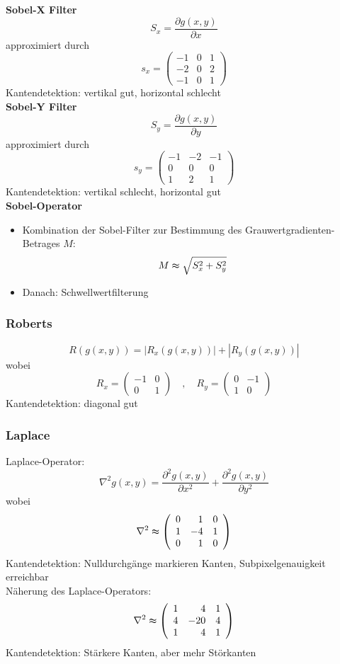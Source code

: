 \textbf{Sobel-X Filter} $$S_x = \frac{\partial g(x,y)}{\partial x}$$ approximiert durch $$s_x = \left( \begin{array}{ccc} -1 & 0 & 1 \\ -2 & 0 & 2 \\ -1 & 0 & 1 \end{array} \right)$$
Kantendetektion: vertikal gut, horizontal schlecht \\
\textbf{Sobel-Y Filter} $$S_y = \frac{\partial g(x,y)}{\partial y}$$ approximiert durch $$s_y = \left( \begin{array}{rrr} -1 & -2 & -1 \\ 0 & 0 & 0 \\ 1 & 2 & 1 \end{array} \right)$$
Kantendetektion: vertikal schlecht, horizontal gut \\
\textbf{Sobel-Operator}
\begin{itemize}
\item Kombination der Sobel-Filter zur Bestimmung des Grauwertgradienten-Betrages $M$: $$M \thickapprox \sqrt{S_x^2 + S_y^2}$$
\item Danach: Schwellwertfilterung
\end{itemize}

\subsubsection*{Roberts}

$$R(g(x,y)) = |R_x(g(x,y))| + |R_y(g(x,y))|$$ wobei $$R_x = \left( \begin{array}{rr} -1 & 0 \\ 0 & 1 \end{array} \right) \quad , \quad R_y = \left( \begin{array}{rr} 0 & -1 \\ 1 & 0 \end{array} \right)$$
Kantendetektion: diagonal gut

\subsubsection*{Laplace}

Laplace-Operator: $$\nabla^2 g(x,y) = \frac{\partial^2 g(x,y)}{\partial x^2} + \frac{\partial^2 g(x,y)}{\partial y^2}$$ wobei $$\nabla^2 \thickapprox \left( \begin{array}{rrr} 0 & 1 & 0 \\ 1 & -4 & 1 \\ 0 & 1 & 0 \end{array} \right)$$
Kantendetektion: Nulldurchgänge markieren Kanten, Subpixelgenauigkeit erreichbar \\ Näherung des Laplace-Operators: $$\nabla^2 \thickapprox \left( \begin{array}{rrr} 1 & 4 & 1 \\ 4 & -20 & 4 \\ 1 & 4 & 1 \end{array} \right)$$
Kantendetektion: Stärkere Kanten, aber mehr Störkanten


